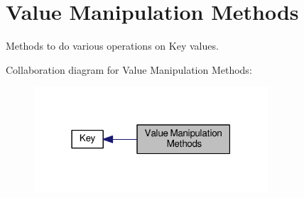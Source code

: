 \hypertarget{group__keyvalue}{\section{Value Manipulation Methods}
\label{group__keyvalue}
}


Methods to do various operations on Key values.  


Collaboration diagram for Value Manipulation Methods\+:
\nopagebreak
\begin{figure}[H]
\begin{center}
\leavevmode
\includegraphics[width=247pt]{group__keyvalue}
\end{center}
\end{figure}
